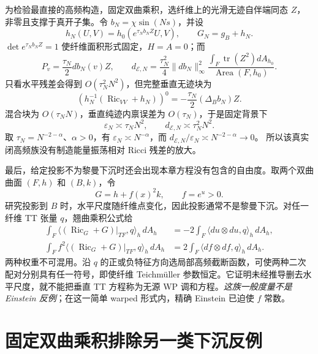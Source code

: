 \documentclass[UTF8,fontset=fandol,zihao=-4,oneside,openany]{ctexbook}
\theoremstyle{cjkplain}
\numberwithin{equation}{chapter}
\begin{document}
为检验最直接的高频构造，固定双曲乘积，选纤维上的光滑无迹自伴端同态 $Z$，非零且支撑于真开子集。令 $b_N=\chi\sin(Ns)$，并设
\begin{equation}\label{SUB:matrix-family}
h_N(U,V)=h_0(e^{\tau_Nb_NZ}U,V),\qquad G_N=g_B+h_N.
\end{equation}
$\det e^{\tau_Nb_NZ}=1$ 使纤维面积形式固定，$H=A=0$；而
\[
P_v=\frac{\tau_N}{2}db_N(v)Z,\qquad
 d_{\mathcal E,N}=\frac{\tau_N^2}{4}\|db_N\|_\infty^2
 \frac{\int_F\operatorname{tr}(Z^2)dA_{h_0}}{\operatorname{Area}(F,h_0)}.
\]
只看水平残差会得到 $O(\tau_N^2N^2)$，但完整垂直无迹块为
\[
(h_N^{-1}(\operatorname{Ric}_{VV}+h_N))^0
=-\frac{\tau_N}{2}(\Delta_Bb_N)Z.
\]
混合块为 $O(\tau_NN)$，垂直纯迹内禀误差为 $O(\tau_N)$，于是固定背景下
\begin{equation}\label{SUB:frequency-scaling}
\varepsilon_N\asymp\tau_NN^2,\qquad
 d_{\mathcal E,N}\asymp\tau_N^2N^2.
\end{equation}
取 $\tau_N=N^{-2-\alpha}$、$\alpha>0$，有
$\varepsilon_N\asymp N^{-\alpha}$，而
$d_{\mathcal E,N}/\varepsilon_N\asymp N^{-2-\alpha}\to0$。
所以该真实闭高频族没有制造能量振荡相对 Ricci 残差的放大。

最后，给定投影不为黎曼下沉时还会出现本章方程没有包含的自由度。取两个双曲曲面 $(F,h)$ 和 $(B,k)$，令
\[
G=h+f(x)^2k,\qquad f=e^u>0.
\]
研究投影到 $B$ 时，水平尺度随纤维点变化，因此投影通常不是黎曼下沉。对任一纤维 TT 张量 $q$，翘曲乘积公式给
\begin{equation}\label{SUB:TT-source}
\begin{aligned}
\int_F\langle(\operatorname{Ric}_G+G)|_{TF},q\rangle_h\,dA_h
 &=-2\int_F\langle du\otimes du,q\rangle_h\,dA_h,\\
\int_Ff^2\langle(\operatorname{Ric}_G+G)|_{TF},q\rangle_h\,dA_h
 &=2\int_F\langle df\otimes df,q\rangle_h\,dA_h.
\end{aligned}
\end{equation}
两种权重不可混用。沿 $q$ 的正或负特征方向选局部高频截断函数，可使两种二次配对分别具有任一符号，即使纤维 Teichmüller 参数恒定。它证明未经推导删去水平尺度，就不能把垂直 TT 方程称为无源 WP 调和方程。\emph{这族一般度量不是 Einstein 反例}；在这一简单 warped 形式内，精确 Einstein 已迫使 $f$ 常数。

\section{固定双曲乘积排除另一类下沉反例}
\end{document}
